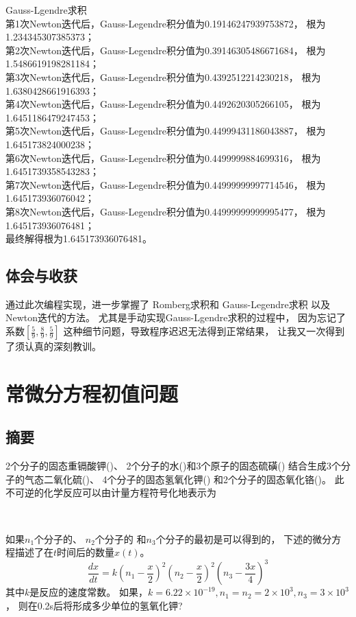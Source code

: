 \documentclass{article}
\begin{document}
Gauss-Lgendre求积 \\
第1次Newton迭代后，Gauss-Legendre积分值为0.19146247939753872，	根为1.234345307385373；\\
第2次Newton迭代后，Gauss-Legendre积分值为0.39146305486671684，	根为1.5486619198281184；\\
第3次Newton迭代后，Gauss-Legendre积分值为0.4392512214230218，	根为1.6380428661916393；\\
第4次Newton迭代后，Gauss-Legendre积分值为0.4492620305266105，	根为1.6451186479247453；\\
第5次Newton迭代后，Gauss-Legendre积分值为0.44999431186043887，	根为1.645173824000238；\\
第6次Newton迭代后，Gauss-Legendre积分值为0.4499999884699316，	根为1.6451739358543283；\\
第7次Newton迭代后，Gauss-Legendre积分值为0.44999999997714546，	根为1.645173936076042；\\
第8次Newton迭代后，Gauss-Legendre积分值为0.44999999999995477，	根为1.645173936076481；\\
最终解得根为1.645173936076481。

\subsection{体会与收获}
通过此次编程实现，进一步掌握了
Romberg求积和
Gauss-Legendre求积
以及Newton迭代的方法。
尤其是手动实现Gauss-Lgendre求积的过程中，
因为忘记了系数$[\frac{5}{9},\frac{8}{9},\frac{5}{9}]$
这种细节问题，导致程序迟迟无法得到正常结果，
让我又一次得到了须认真的深刻教训。

\newpage
\section{常微分方程初值问题}
\subsection{摘要}

2个分子的固态重镉酸钾()、
2个分子的水()和3个原子的固态硫磺()
结合生成3个分子的气态二氧化硫()、
4个分子的固态氢氧化钾()
和2个分子的固态氧化铬()。 
此不可逆的化学反应可以由计量方程符号化地表示为
\begin{center}
     \\ 
\end{center}
如果$n_1$个分子的、
$n_2$个分子的
和$n_3$个分子的最初是可以得到的，
下述的微分方程描述了在$t$时间后的数量$x(t)$。
\begin{equation}
    \frac{dx}{dt} = k(n_1-\frac{x}{2})^2(n_2-\frac{x}{2})^2(n_3-\frac{3x}{4})^3
\end{equation}
其中$k$是反应的速度常数。
如果，$k=6.22\times 10^{-19},n_1=n_2=2\times10^3, n_3=3\times10^3$，
则在0.2s后将形成多少单位的氢氧化钾?
\end{document}
